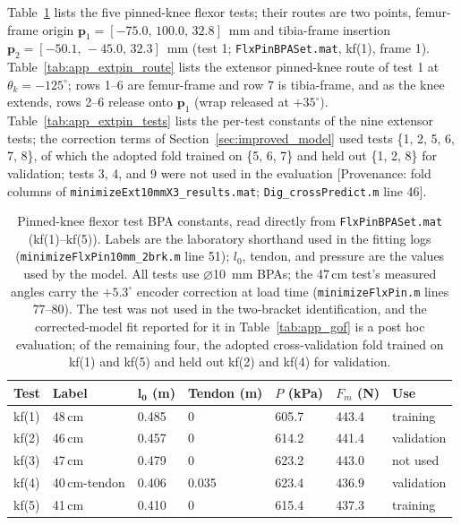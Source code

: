 Table~\ref{tab:app_flxpin_tests} lists the five pinned-knee flexor tests; their routes are two points, femur-frame origin $\mathbf{p}_{1} = [-75.0,\,100.0,\,32.8]$~mm and tibia-frame insertion $\mathbf{p}_{2} = [-50.1,\,-45.0,\,32.3]$~mm (test 1; \texttt{FlxPinBPASet.mat}, kf(1), frame 1). Table~\ref{tab:app_extpin_route} lists the extensor pinned-knee route of test 1 at $\theta_{k}=-125^{\circ}$; rows 1--6 are femur-frame and row 7 is tibia-frame, and as the knee extends, rows 2--6 release onto $\mathbf{p}_{1}$ (wrap released at $+35^{\circ}$). Table~\ref{tab:app_extpin_tests} lists the per-test constants of the nine extensor tests; the correction terms of Section~\ref{sec:improved_model} used tests \{1, 2, 5, 6, 7, 8\}, of which the adopted fold trained on \{5, 6, 7\} and held out \{1, 2, 8\} for validation; tests 3, 4, and 9 were not used in the evaluation [Provenance: fold columns of \texttt{minimizeExt10mmX3\_results.mat}; \texttt{Dig\_crossPredict.m} line 46].

\begin{table}[htbp]
\caption{Pinned-knee flexor test BPA constants, read directly from \texttt{FlxPinBPASet.mat} (kf(1)--kf(5)). Labels are the laboratory shorthand used in the fitting logs (\texttt{minimizeFlxPin10mm\_2brk.m} line 51); $l_{0}$, tendon, and pressure are the values used by the model. All tests use $\diameter$\qty{10}{\mm} BPAs; the 47\,cm test's measured angles carry the $+5.3^{\circ}$ encoder correction at load time (\texttt{minimizeFlxPin.m} lines 77--80). The test was not used in the two-bracket identification, and the corrected-model fit reported for it in Table~\ref{tab:app_gof} is a post hoc evaluation; of the remaining four, the adopted cross-validation fold trained on kf(1) and kf(5) and held out kf(2) and kf(4) for validation.}
\label{tab:app_flxpin_tests}
\begin{tabular}{@{}lllllll@{}}
\toprule
\textbf{Test} & \textbf{Label} & $\boldsymbol{l_{0}}$ (m) & Tendon (m) & $P$ (kPa) & $F_{m}$ (N) & \textbf{Use} \\
\midrule
kf(1) & 48\,cm         & 0.485 & 0     & 605.7 & 443.4 & training \\
kf(2) & 46\,cm         & 0.457 & 0     & 614.2 & 441.4 & validation \\
kf(3) & 47\,cm         & 0.479 & 0     & 623.2 & 443.0 & not used \\
kf(4) & 40\,cm-tendon  & 0.406 & 0.035 & 623.4 & 436.9 & validation \\
kf(5) & 41\,cm         & 0.410 & 0     & 615.4 & 437.3 & training \\
\bottomrule
\end{tabular}
\end{table}


